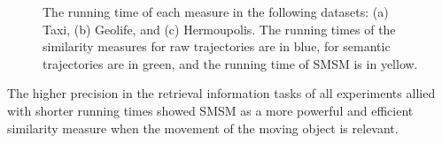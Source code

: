 \begin{figure}[ht!]
\begin{subfigure}[c]{0.5\textwidth}
        \caption{}
        \label{fig:running_time_hermoupolis}
    \end{subfigure}\hfill %
    \caption{The running time of each measure in the following datasets: (a) Taxi, (b) Geolife, and (c) Hermoupolis. The running times of the similarity measures for raw trajectories are in blue, for semantic trajectories are in green, and the running time of SMSM is in yellow. }
    \label{fig:running_time_graphs}
\end{figure}

The higher precision in the retrieval information tasks of all experiments allied with shorter running times showed SMSM as a more powerful and efficient similarity measure when the movement of the moving object is relevant.